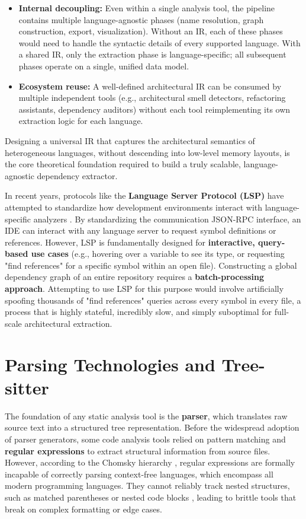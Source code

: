 \begin{itemize}
  \item \textbf{Internal decoupling:} Even within a single analysis
    tool, the pipeline contains multiple language-agnostic phases
    (name resolution, graph construction, export, visualization).
    Without an IR, each of these phases would need to handle the
    syntactic details of every supported language. With a shared IR,
    only the extraction phase is language-specific; all subsequent
    phases operate on a single, unified data model.
  \item \textbf{Ecosystem reuse:} A well-defined architectural IR can
    be consumed by multiple independent tools (e.g., architectural
    smell detectors, refactoring assistants, dependency auditors)
    without each tool reimplementing its own extraction logic for each
    language.
\end{itemize}

Designing a universal IR that captures the architectural semantics of
heterogeneous languages, without descending into low-level memory
layouts, is the core theoretical foundation required to build a truly
scalable, language-agnostic dependency extractor.

In recent years, protocols like the \textbf{Language Server Protocol
(LSP)} have attempted to standardize how development environments
interact with language-specific analyzers \cite{microsoft_lsp_spec}.
By standardizing the communication JSON-RPC interface, an IDE can
interact with any language server to request symbol definitions or
references. However, LSP is fundamentally designed for
\textbf{interactive, query-based use cases} (e.g., hovering over a
  variable to see its type, or requesting "find references" for a
specific symbol within an open file). Constructing a global
dependency graph of an entire repository requires a
\textbf{batch-processing approach}. Attempting to use LSP for this
purpose would involve artificially spoofing thousands of "find
references" queries across every symbol in every file, a process that
is highly stateful, incredibly slow, and simply suboptimal for
full-scale architectural extraction.

\section{Parsing Technologies and Tree-sitter}
\label{sec:parsing_and_treesitter}

The foundation of any static analysis tool is the \textbf{parser},
which translates raw source text into a structured tree
representation. Before the widespread adoption of parser generators,
some code analysis tools relied on pattern matching and
\textbf{regular expressions} to extract structural information from
source files. However, according to the Chomsky hierarchy
\cite{chomsky_three_1956}\cite{jager_formal_2012}, regular
expressions are formally incapable of correctly parsing context-free
languages, which encompass all modern programming languages. They
cannot reliably track nested structures, such as matched parentheses
or nested code blocks \cite{aho_compilers_2007}, leading to brittle
tools that break on complex formatting or edge cases.

